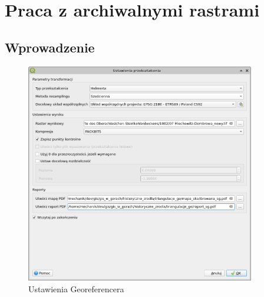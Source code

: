 \documentclass[a4paper,11pt, onecolumn, openany]{memoir}
\begin{document}
	\chapter{Praca z archiwalnymi rastrami}
		\section{Wprowadzenie}

			\begin{figure}[!ht]
			\centering
			\includegraphics[width=10cm]{georef-ustawienia}
			\caption{Ustawienia Georeferencera}
		\end{figure}
\end{document}
